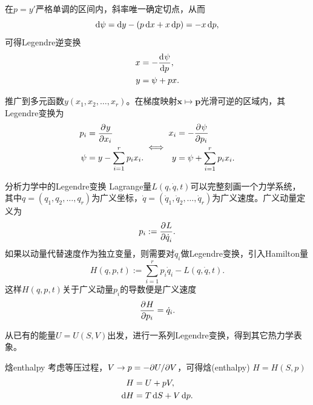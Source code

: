 \begin{corollary}
	在$p = y'$严格单调的区间内，斜率唯一确定切点，从而
	\[
		\mathop{}\!\mathrm{d}\psi = \mathop{}\!\mathrm{d} y - (p\mathop{}\!\mathrm{d} x + x\mathop{}\!\mathrm{d} p) = -x\mathop{}\!\mathrm{d} p,
	\]
	可得Legendre逆变换
	\begin{subequations}
		\begin{align}
			x &= -\frac{\mathop{}\!\mathrm{d}^{}\psi}{\mathrm{d}{p}^{}},\\
			y &= \psi + px.
		\end{align}
	\end{subequations}
\end{corollary}

\begin{corollary}
	推广到多元函数$y(x_1,x_2,\ldots,x_r)$。在梯度映射$\bm x \mapsto \bm p$光滑可逆的区域内，其Legendre变换为
	\begin{equation}
		\label{eq:sm-multivariable-legendre-transform}
		\begin{aligned}
			p_i & = \frac{\partial^{}y}{\partial{x_i}^{}}            \\
			\psi & = y - \sum_{i=1}^rp_ix_i.
		\end{aligned}
		\iff
		\begin{aligned}
			x_i & = -\frac{\partial^{}\psi}{\partial{p_i}^{}}            \\
			y & = \psi + \sum_{i=1}^rp_ix_i.
		\end{aligned}
	\end{equation}
\end{corollary}

\begin{example}{分析力学中的Legendre变换}{}
	Lagrange量$L(q,\dot q,t)$可以完整刻画一个力学系统，
	其中$q = (q_1,q_2,\ldots,q_r)$为广义坐标，$\dot q = (\dot q_1,\dot q_2,\ldots,\dot q_r)$为广义速度。广义动量定义为
	\[
		p_i := \frac{\partial^{}L}{\partial{\dot q_i}^{}}.
	\]
	如果以动量代替速度作为独立变量，则需要对$\dot q_i$做Legendre变换，引入Hamilton量
	\begin{equation}
		H(q,p,t) := \sum_{i=1}^rp_i\dot q_i - L(q,\dot q,t).
	\end{equation}
	这样$H(q,p,t)$关于广义动量$p_i$的导数便是广义速度
	\[
		\frac{\partial^{}H}{\partial{p_i}^{}} = \dot q_i.
	\]
\end{example}

从已有的能量$U = U(S,V)$出发，进行一系列Legendre变换，得到其它热力学表象。

\begin{definition}
	{焓}{enthalpy}
	考虑等压过程，$V \to p = -\partial U/\partial V$，可得焓(enthalpy) $H = H(S,p)$
	\begin{subequations}
		\begin{align}
			H &= U + pV,\\
			\mathop{}\!\mathrm{d} H &= T\mathop{}\!\mathrm{d} S + V\mathop{}\!\mathrm{d} p.
		\end{align}
	\end{subequations}
\end{definition}

